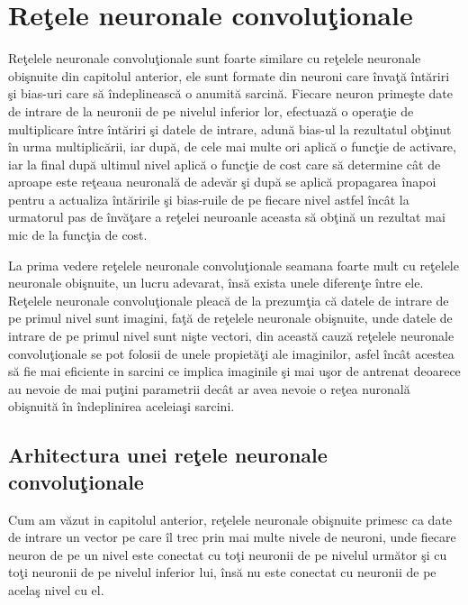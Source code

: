 \chapter{Re\c{t}ele neuronale convolu\c{t}ionale}

Re\c{t}elele neuronale convolu\c{t}ionale  sunt foarte similare cu re\c{t}elele neuronale obi\c{s}nuite din capitolul anterior, ele sunt formate din neuroni care \^{i}nva\c{t}\u{a} \^{i}nt\u{a}riri \c{s}i bias-uri care s\u{a} \^{i}ndeplineasc\u{a} o anumit\u{a} sarcin\u{a}. Fiecare neuron prime\c{s}te date de intrare de la neuronii de pe nivelul inferior lor, efectuaz\u{a} o opera\c{t}ie de multiplicare \^{i}ntre \^{i}nt\u{a}riri \c{s}i datele de intrare, adun\u{a} bias-ul la rezultatul ob\c{t}inut \^{i}n urma multiplic\u{a}rii, iar dup\u{a}, de cele mai multe ori aplic\u{a} o func\c{t}ie de activare, iar la final dup\u{a} ultimul nivel aplic\u{a} o func\c{t}ie de cost care s\u{a} determine c\^{a}t de aproape este re\c{t}eaua neuronal\u{a} de adev\u{a}r \c{s}i dup\u{a} se aplic\u{a} propagarea \^{i}napoi pentru a actualiza \^{i}nt\u{a}ririle \c{s}i bias-ruile de pe fiecare nivel astfel \^{i}nc\^{a}t la urmatorul pas de \^{i}nv\u{a}\c{t}are a re\c{t}elei neuroanle aceasta s\u{a} ob\c{t}in\u{a} un rezultat mai mic de la func\c{t}ia de cost.

La prima vedere re\c{t}elele neuronale convolu\c{t}ionale seamana foarte mult cu re\c{t}elele neuronale obi\c{s}nuite, un lucru adevarat, \^{i}ns\u{a} exista unele diferen\c{t}e \^{i}ntre ele. Re\c{t}elele neuronale convolu\c{t}ionale pleac\u{a} de la prezum\c{t}ia c\u{a} datele de intrare de pe primul nivel sunt imagini, fa\c{t}\u{a} de re\c{t}elele neuronale obi\c{s}nuite, unde datele de intrare de pe primul nivel sunt ni\c{s}te vectori, din aceast\u{a} cauz\u{a} re\c{t}elele neuronale convolu\c{t}ionale se pot folosii de unele propiet\u{a}\c{t}i ale imaginilor, asfel \^{i}nc\^{a}t acestea s\u{a} fie mai eficiente in sarcini ce implica imaginile \c{s}i mai u\c{s}or de antrenat deoarece au nevoie de mai pu\c{t}ini parametrii dec\^{a}t ar avea nevoie o re\c{t}ea nuronal\u{a} obi\c{s}nuit\u{a} \^{i}n \^{i}ndeplinirea aceleia\c{s}i sarcini.

\section{Arhitectura unei re\c{t}ele neuronale convolu\c{t}ionale}

Cum am v\u{a}zut in capitolul anterior, re\c{t}elele neuronale obi\c{s}nuite primesc ca date de intrare un  vector pe care \^{i}l trec prin mai multe nivele de neuroni, unde fiecare neuron de pe un nivel este conectat cu to\c{t}i neuronii de pe nivelul urm\u{a}tor \c{s}i cu to\c{t}i neuronii de pe nivelul inferior lui, \^{i}ns\u{a} nu este conectat cu neuronii de pe acela\c{s} nivel cu el. 

